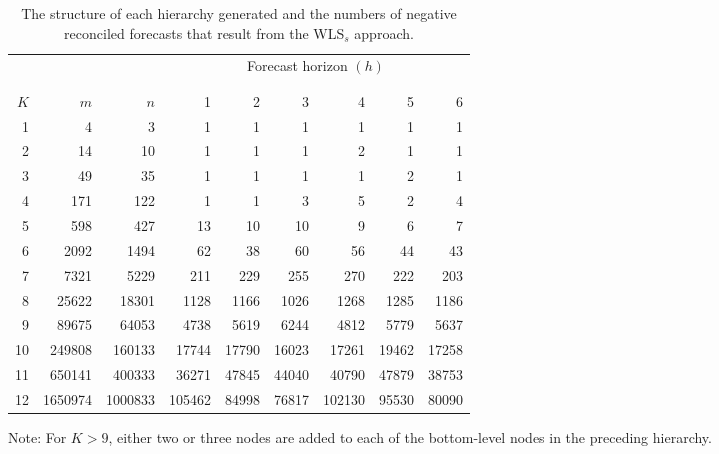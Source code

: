 \documentclass[11pt]{article}
\newcommand{\0}{\phantom{0}}
\begin{document}
\begin{table}[ht]
	\caption{The structure of each hierarchy generated and the numbers of negative reconciled forecasts that result from the WLS$_{s}$ approach.}
	\label{tbl:negstrwls}
	\centering
	\begin{threeparttable}
		\begin{tabular}{rrrrrrrrr}
			\toprule
			& & & \multicolumn{6}{c}{Forecast horizon $(h)$}\\[-0.3cm]\\\cline{4-9}\\[-0.3cm]
			$K$ & $m$ & $n$ & 1 & 2 & 3 & 4 & 5 & 6\\
			\midrule
			1 & 4 & 3 & 1 & 1 & 1 & 1 & 1 & 1\\
			2 & 14 & 10 & 1 & 1 & 1 & 2 & 1 & 1 \\
			3 & 49 & 35 & 1 & 1 & 1 & 1 & 2 & 1 \\
			4 & 171 & 122 & 1 & 1 & 3 & 5 & 2 & 4 \\
			5 & 598 & 427 & 13 & 10 & 10 & 9 & 6 & 7 \\
			6 & 2092 & 1494 & 62 & 38 & 60 & 56 & 44 & 43 \\
			7 & 7321 & 5229 & 211 & 229 & 255 & 270 & 222 & 203 \\
			8 & 25622 & 18301 & 1128 & 1166 & 1026 & 1268 & 1285 & 1186 \\
			9 & 89675 & 64053 & 4738 & 5619 & 6244 & 4812 & 5779 & 5637 \\
			10 & 249808 & 160133 & 17744 & 17790 & 16023 & 17261 & 19462 & 17258 \\
			11 & 650141 & 400333 & 36271 & 47845 & 44040 & 40790 & 47879 & 38753 \\
			12 & 1650974 & 1000833 & 105462 & 84998 & 76817 & 102130 & 95530 & 80090 \\
			\bottomrule
		\end{tabular}
		\begin{tablenotes}
			\item [] Note: For $K > 9$, either two or three nodes are added to each of the bottom-level nodes in the preceding hierarchy.
		\end{tablenotes}
	\end{threeparttable}
\end{table}
\end{document}
